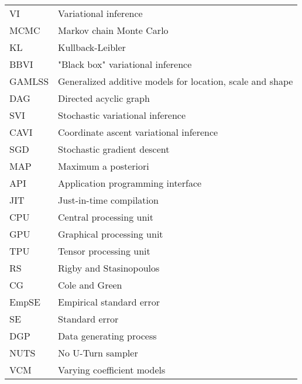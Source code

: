 \begin{tabular}{@{} l @{\hskip 1in} l}
  VI & Variational inference \\
  MCMC & Markov chain Monte Carlo \\
  KL & Kullback-Leibler \\
  BBVI & "Black box" variational inference \\
  GAMLSS & Generalized additive models for location, scale and shape \\
  DAG & Directed acyclic graph \\ 
  SVI & Stochastic variational inference \\
  CAVI & Coordinate ascent variational inference \\
  SGD & Stochastic gradient descent \\
  MAP & Maximum a posteriori \\
  API & Application programming interface \\
  JIT & Just-in-time compilation \\
  CPU & Central processing unit \\
  GPU & Graphical processing unit \\
  TPU & Tensor processing unit \\
  RS & Rigby and Stasinopoulos \\
  CG & Cole and Green \\
  EmpSE & Empirical standard error \\
  SE & Standard error \\
  DGP & Data generating process \\
  NUTS & No U-Turn sampler \\
  VCM & Varying coefficient models \\
\end{tabular}
